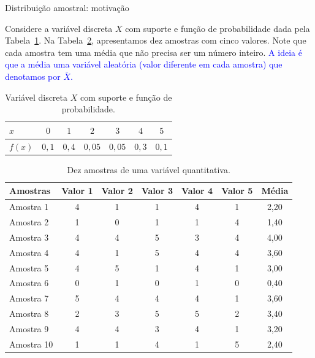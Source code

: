 \documentclass[9pt]{beamer}
\begin{document}
\begin{frame}{Distribuição amostral: motivação}

Considere a variável discreta $X$ com suporte e função de probabilidade dada pela Tabela~\ref{tab:var_X}. Na Tabela~\ref{tab:amostras_disc}, apresentamos dez amostras com cinco valores. Note que cada amostra tem uma média que não precisa ser um número inteiro. \textcolor{blue}{A ideia é que a média uma variável aleatória (valor diferente em cada amostra) que denotamos por $\bar{X}$.} 

\scriptsize

\begin{table}[htbp]
	\centering
	\caption{Variável discreta $X$ com suporte e função de probabilidade.}
	\label{tab:var_X}
	\begin{tabular}{l|cccccc}
		\toprule[0.05cm]
		$x$ & $0$ & $1$ & $2$ & $3$ & $4$ & $5$ \\ \midrule[0.05cm]
		$f(x)$ & $0,1$ & $0,4$ & $0,05$ & $0,05$ & $0,3$ & $0,1$ \\
		\bottomrule[0.05cm]
	\end{tabular}
\end{table}


	\begin{table}[ht]
		\centering
				\caption{Dez amostras de uma variável quantitativa.} 
		\label{tab:amostras_disc}
		\begin{tabular}{l|ccccc|c}
			\toprule[0.05cm]
		Amostras	& Valor 1 & Valor 2 & Valor 3 & Valor 4 & Valor 5 & Média \\ 
			\midrule[0.05cm]
			Amostra 1 & 4 & 1 & 1 & 4 & 1 & 2,20 \\ 
			Amostra 2 & 1 & 0 & 1 & 1 & 4 & 1,40 \\ 
			Amostra 3 & 4 & 4 & 5 & 3 & 4 & 4,00 \\ 
			Amostra 4 & 4 & 1 & 5 & 4 & 4 & 3,60 \\ 
			Amostra 5 & 4 & 5 & 1 & 4 & 1 & 3,00 \\ 
			Amostra 6 & 0 & 1 & 0 & 1 & 0 & 0,40 \\ 
			Amostra 7 & 5 & 4 & 4 & 4 & 1 & 3,60 \\ 
			Amostra 8 & 2 & 3 & 5 & 5 & 2 & 3,40 \\ 
			Amostra 9 & 4 & 4 & 3 & 4 & 1 & 3,20 \\ 
			Amostra 10 & 1 & 1 & 4 & 1 & 5 & 2,40 \\ 
			\bottomrule[0.05cm]
		\end{tabular}

	\end{table}

\normalsize
\end{frame}
\end{document}
